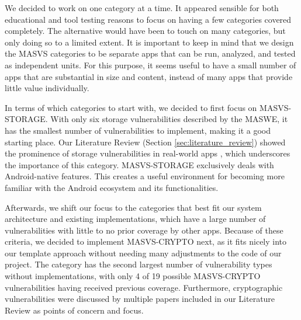 We decided to work on one category at a time. It appeared sensible for both educational and tool testing reasons to focus on having a few categories covered completely. The alternative would have been to touch on many categories, but only doing so to a limited extent. It is important to keep in mind that we design the MASVS categories to be separate apps that can be run, analyzed, and tested as independent units. For this purpose, it seems useful to have a small number of apps that are substantial in size and content, instead of many apps that provide little value individually.

In terms of which categories to start with, we decided to first focus on MASVS-STORAGE. With only six storage vulnerabilities described by the MASWE, it has the smallest number of vulnerabilities to implement, making it a good starting place. Our Literature Review (Section \ref{sec:literature_review}) showed the prominence of storage vulnerabilities in real-world apps \cite{paper_02}, which underscores the importance of this category. MASVS-STORAGE exclusively deals with Android-native features. This creates a useful environment for becoming more familiar with the Android ecosystem and its functionalities. 

Afterwards, we shift our focus to the categories that best fit our system architecture and existing implementations, which have a large number of vulnerabilities with little to no prior coverage by other apps. Because of these criteria, we decided to implement MASVS-CRYPTO next, as it fits nicely into our template approach without needing many adjustments to the code of our project. The category has the second largest number of vulnerability types without implementations, with only 4 of 19 possible MASVS-CRYPTO vulnerabilities having received previous coverage. Furthermore, cryptographic vulnerabilities were discussed by multiple papers \cite{paper_07, paper_14} included in our Literature Review as points of concern and focus.